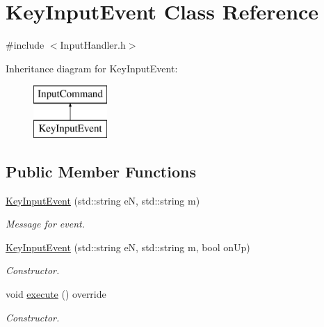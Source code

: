\hypertarget{class_key_input_event}{\section{Key\+Input\+Event Class Reference}
\label{class_key_input_event}
}


{\ttfamily \#include $<$Input\+Handler.\+h$>$}

Inheritance diagram for Key\+Input\+Event\+:\begin{figure}[H]
\begin{center}
\leavevmode
\includegraphics[height=2.000000cm]{class_key_input_event}
\end{center}
\end{figure}
\subsection*{Public Member Functions}
\begin{DoxyCompactItemize}
\item 
\hypertarget{class_key_input_event_a1efbabce2c329de646985d2866bc349b}{\hyperlink{class_key_input_event_a1efbabce2c329de646985d2866bc349b}{Key\+Input\+Event} (std\+::string e\+N, std\+::string m)}\label{class_key_input_event_a1efbabce2c329de646985d2866bc349b}

\begin{DoxyCompactList}\small\item\em Message for event. \end{DoxyCompactList}\item 
\hypertarget{class_key_input_event_a1275e31313079f5258618302153c0d88}{\hyperlink{class_key_input_event_a1275e31313079f5258618302153c0d88}{Key\+Input\+Event} (std\+::string e\+N, std\+::string m, bool on\+Up)}\label{class_key_input_event_a1275e31313079f5258618302153c0d88}

\begin{DoxyCompactList}\small\item\em Constructor. \end{DoxyCompactList}\item 
void \hyperlink{class_key_input_event_ae607856dd9443a66ee1a1f6446f964cc}{execute} () override
\begin{DoxyCompactList}\small\item\em Constructor. \end{DoxyCompactList}\end{DoxyCompactItemize}
